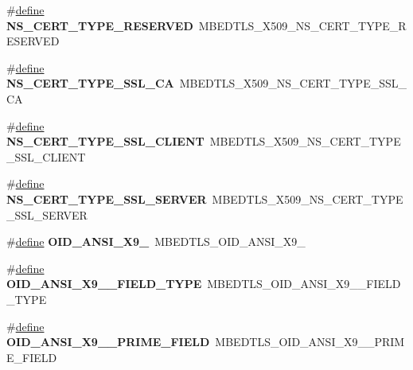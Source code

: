 \begin{DoxyCompactItemize}
\#\hyperlink{structdefine}{define} {\bfseries N\+S\+\_\+\+C\+E\+R\+T\+\_\+\+T\+Y\+P\+E\+\_\+\+R\+E\+S\+E\+R\+V\+ED}~M\+B\+E\+D\+T\+L\+S\+\_\+\+X509\+\_\+\+N\+S\+\_\+\+C\+E\+R\+T\+\_\+\+T\+Y\+P\+E\+\_\+\+R\+E\+S\+E\+R\+V\+ED
\item 
\mbox{\label{compat-1_83_8h_a9f5cdaf33a0371bdd6893f7c36acf8ef}} 
\#\hyperlink{structdefine}{define} {\bfseries N\+S\+\_\+\+C\+E\+R\+T\+\_\+\+T\+Y\+P\+E\+\_\+\+S\+S\+L\+\_\+\+CA}~M\+B\+E\+D\+T\+L\+S\+\_\+\+X509\+\_\+\+N\+S\+\_\+\+C\+E\+R\+T\+\_\+\+T\+Y\+P\+E\+\_\+\+S\+S\+L\+\_\+\+CA
\item 
\mbox{\label{compat-1_83_8h_a1720f538cb0b7efa97d134ac6692192a}} 
\#\hyperlink{structdefine}{define} {\bfseries N\+S\+\_\+\+C\+E\+R\+T\+\_\+\+T\+Y\+P\+E\+\_\+\+S\+S\+L\+\_\+\+C\+L\+I\+E\+NT}~M\+B\+E\+D\+T\+L\+S\+\_\+\+X509\+\_\+\+N\+S\+\_\+\+C\+E\+R\+T\+\_\+\+T\+Y\+P\+E\+\_\+\+S\+S\+L\+\_\+\+C\+L\+I\+E\+NT
\item 
\mbox{\label{compat-1_83_8h_a725ac67650ba113b8a8938e1f9cdb073}} 
\#\hyperlink{structdefine}{define} {\bfseries N\+S\+\_\+\+C\+E\+R\+T\+\_\+\+T\+Y\+P\+E\+\_\+\+S\+S\+L\+\_\+\+S\+E\+R\+V\+ER}~M\+B\+E\+D\+T\+L\+S\+\_\+\+X509\+\_\+\+N\+S\+\_\+\+C\+E\+R\+T\+\_\+\+T\+Y\+P\+E\+\_\+\+S\+S\+L\+\_\+\+S\+E\+R\+V\+ER
\item 
\mbox{\label{compat-1_83_8h_a80de5d243898b4fafc9287ed8aab5ec8}} 
\#\hyperlink{structdefine}{define} {\bfseries O\+I\+D\+\_\+\+A\+N\+S\+I\+\_\+\+X9\+\_}~M\+B\+E\+D\+T\+L\+S\+\_\+\+O\+I\+D\+\_\+\+A\+N\+S\+I\+\_\+\+X9\+\_
\item 
\mbox{\label{compat-1_83_8h_a7fb8de1fb7902758a1d2158cddfedd5a}} 
\#\hyperlink{structdefine}{define} {\bfseries O\+I\+D\+\_\+\+A\+N\+S\+I\+\_\+\+X9\+\_\+\_\+\+F\+I\+E\+L\+D\+\_\+\+T\+Y\+PE}~M\+B\+E\+D\+T\+L\+S\+\_\+\+O\+I\+D\+\_\+\+A\+N\+S\+I\+\_\+\+X9\+\_\+\_\+\+F\+I\+E\+L\+D\+\_\+\+T\+Y\+PE
\item 
\mbox{\label{compat-1_83_8h_a94f681f061148e5ef616a7ea25700c50}} 
\#\hyperlink{structdefine}{define} {\bfseries O\+I\+D\+\_\+\+A\+N\+S\+I\+\_\+\+X9\+\_\+\_\+\+P\+R\+I\+M\+E\+\_\+\+F\+I\+E\+LD}~M\+B\+E\+D\+T\+L\+S\+\_\+\+O\+I\+D\+\_\+\+A\+N\+S\+I\+\_\+\+X9\+\_\+\_\+\+P\+R\+I\+M\+E\+\_\+\+F\+I\+E\+LD

\end{DoxyCompactItemize}
